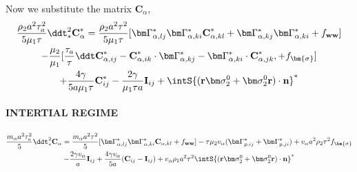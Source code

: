 Now we substitute the matrix $\textbf{C}_\alpha$, 
\begin{multline}    
    \frac{\rho_2 a^2 \tau_a^2}{5\mu_1 \tau}\ddt^2_* \textbf{C}_\alpha^*
    =  \frac{\rho_2 a^2 \tau^2}{5 \mu_1 \tau}[
    \bm\Gamma_{\alpha,lj}^* \bm\Gamma_{\alpha,ki}^* \textbf{C}_{\alpha,kl}^* 
    + \bm\Gamma_{\alpha,kj}^* \bm\Gamma_{\alpha,ki}^* 
    + f_\textbf{ww}]\\
    - \frac{\mu_2}{\mu_1}  [
        \frac{\tau_a}{\tau}\ddt \textbf{C}_{\alpha,ij}^*
        - \textbf{C}_{\alpha,ik}^* \cdot \bm\Gamma_{\alpha,kj}^*
        -  \bm\Gamma_{\alpha,ki}^* \cdot \textbf{C}_{\alpha,jk}^*,
    + f_{\bm{\sigma}}]\\
    + \frac{4 \gamma }{5 a \mu_1 \tau} \textbf{C}_{ij}^*
        - \frac{2 \gamma }{\mu_1 \tau a} \textbf{I}_{ij} 
        + \intS{(\textbf{r}\bm\sigma_2^0+ \bm\sigma_2^0\textbf{r})\cdot \textbf{n}}^*
\end{multline}

\paragraph*{INTERTIAL REGIME}
\begin{multline}    
    \frac{m_\alpha a^2 \tau_a^2}{5}\ddt^2_* \textbf{C}_\alpha
    =  \frac{m_\alpha a^2 \tau^2}{5}[
    \bm\Gamma_{\alpha,lj}^* \bm\Gamma_{\alpha,ki}^* \textbf{C}_{\alpha,kl} + f_\textbf{ww}]
    - \tau \mu_2 v_\alpha (\bm \Gamma_{p,ij}^*+\bm \Gamma_{p,ji}^*)
    + v_\alpha a^2 \rho_2 \tau^2 f_{\bm{\sigma}}\\
        - \frac{2 \gamma v_\alpha }{a} \textbf{I}_{ij} 
        + \frac{4 \gamma v_\alpha }{5 a} (\textbf{C}_{ij} - \textbf{I}_{ij})
        + v_\alpha \rho_1 a^2 \tau^2 \intS{(\textbf{r}\bm\sigma_2^0+ \bm\sigma_2^0\textbf{r})\cdot \textbf{n}}^*
\end{multline}

